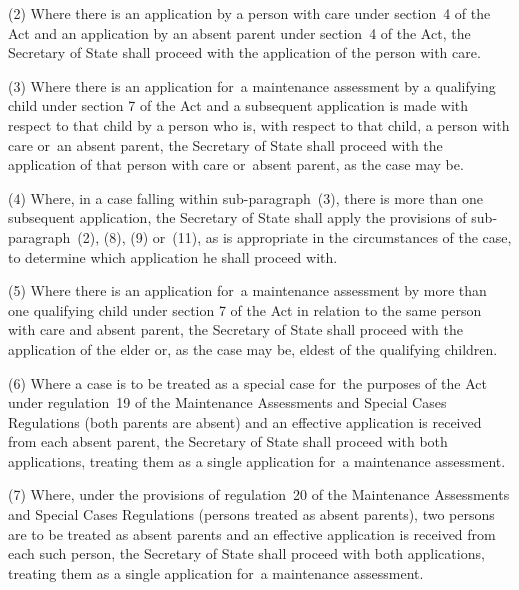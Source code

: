 \documentclass[a4paper,12pt]{article}
\begin{document}
(2) Where there is an application by a person with care under section~4 
of the Act and an application by an absent parent under section~4 of the Act, 
the Secretary of State  %
shall proceed with the application of the person with care.

(3) Where there is an application for~a maintenance assessment by a qualifying child under section 7 of the Act and a subsequent application is made with respect to that child by a person who is, with respect to that child, a person with care or~an absent parent, 
the Secretary of State  %
shall proceed with the application of that person with care or~absent parent, as the case may be.

(4) Where, in a case falling within sub-paragraph~(3), there is more than one subsequent application, 
the Secretary of State  %
shall apply the provisions of sub-paragraph~(2), (8), (9) or~(11), as is appropriate in the circumstances of the case, to determine which application he shall proceed with.

(5) Where there is an application for~a maintenance assessment by more than one qualifying child under section 7 of the Act in relation to the same person with care and absent parent, 
the Secretary of State  %
shall proceed with the application of the elder or, as the case may be, eldest of the qualifying children.

(6) Where a case is to be treated as a special case for~the purposes of the Act under regulation~19 of the Maintenance Assessments and Special Cases Regulations (both parents are absent) and an effective application is received from each absent parent, 
the Secretary of State  %
shall proceed with both applications, treating them as a single application for~a maintenance assessment.

(7) Where, under the provisions of regulation~20 of the Maintenance Assessments and Special Cases Regulations (persons treated as absent parents), two persons are to be treated as absent parents and an effective application is received from each such person, 
the Secretary of State  %
shall proceed with both applications, treating them as a single application for~a maintenance assessment.
\end{document}
